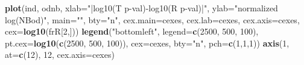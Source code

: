 \documentclass[]{article}
\newenvironment{Shaded}{\begin{snugshade}}{\end{snugshade}}
\newcommand{\KeywordTok}[1]{\textcolor[rgb]{0.13,0.29,0.53}{\textbf{#1}}}
\newcommand{\DataTypeTok}[1]{\textcolor[rgb]{0.13,0.29,0.53}{#1}}
\newcommand{\DecValTok}[1]{\textcolor[rgb]{0.00,0.00,0.81}{#1}}
\newcommand{\StringTok}[1]{\textcolor[rgb]{0.31,0.60,0.02}{#1}}
\newcommand{\NormalTok}[1]{#1}
\begin{document}
\begin{Shaded}
\begin{Highlighting}[]
{\KeywordTok{plot}\NormalTok{(ind, odnb, }\DataTypeTok{xlab=}\StringTok{"|log10(T p-val)-log10(R p-val)|"}\NormalTok{, }\DataTypeTok{ylab=}\StringTok{"normalized log(NBod)"}\NormalTok{, }
\DataTypeTok{main=}\StringTok{""}\NormalTok{, }\DataTypeTok{bty=}\StringTok{"n"}\NormalTok{, }\DataTypeTok{cex.main=}\NormalTok{cexes, }\DataTypeTok{cex.lab=}\NormalTok{cexes, }\DataTypeTok{cex.axis=}\NormalTok{cexes, }\DataTypeTok{cex=}\KeywordTok{log10}\NormalTok{(frR[}\DecValTok{2}\NormalTok{,]))}
\KeywordTok{legend}\NormalTok{(}\StringTok{"bottomleft"}\NormalTok{, }\DataTypeTok{legend=}\KeywordTok{c}\NormalTok{(}\DecValTok{2500}\NormalTok{, }\DecValTok{500}\NormalTok{, }\DecValTok{100}\NormalTok{), }\DataTypeTok{pt.cex=}\KeywordTok{log10}\NormalTok{(}\KeywordTok{c}\NormalTok{(}\DecValTok{2500}\NormalTok{, }\DecValTok{500}\NormalTok{, }\DecValTok{100}\NormalTok{)), }
       \DataTypeTok{cex=}\NormalTok{cexes, }\DataTypeTok{bty=}\StringTok{"n"}\NormalTok{, }\DataTypeTok{pch=}\KeywordTok{c}\NormalTok{(}\DecValTok{1}\NormalTok{,}\DecValTok{1}\NormalTok{,}\DecValTok{1}\NormalTok{))}
\KeywordTok{axis}\NormalTok{(}\DecValTok{1}\NormalTok{, }\DataTypeTok{at=}\KeywordTok{c}\NormalTok{(}\DecValTok{12}\NormalTok{), }\DecValTok{12}\NormalTok{, }\DataTypeTok{cex.axis=}\NormalTok{cexes)}


}
\end{Highlighting}
\end{Shaded}
\end{document}
